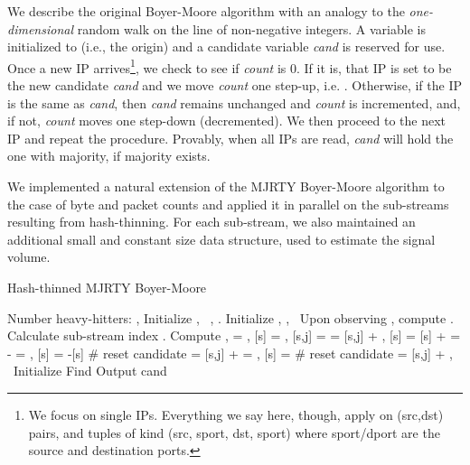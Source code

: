 \documentclass[10pt, conference, letterpaper,onecolumn]{IEEEtranv1.8}
\theoremstyle{plain}\newtheorem{thm}{Theorem}\newtheorem{lem}{Lemma}
\theoremstyle{definition}
\begin{document}
 We describe the original  Boyer-Moore algorithm with an analogy to the \emph{one-dimensional}
 random walk on the line of non-negative integers.  A variable  is initialized to  (i.e., the origin)
 and a  candidate variable \emph{cand} is reserved for use. Once a new IP arrives\footnote{We focus on single IPs. Everything we say here, though, apply on (src,dst) pairs,
and tuples of kind (src, sport, dst, sport) where sport/dport are the source and destination ports.},  
 we check to see if \emph{count} is 0. If it is, that IP is set to be the new candidate \emph{cand}
and  we move \emph{count} one step-up, i.e. . Otherwise, if the IP is the same as \emph{cand}, then 
\emph{cand} remains unchanged and \emph{count} is incremented, and, if not, \emph{count} moves one step-down 
(decremented). We then proceed to the next IP and repeat the procedure. Provably, when all IPs are read,
\emph{cand} will hold  the one with majority, if majority exists.  

 
We implemented a natural extension of the MJRTY Boyer-Moore algorithm to the case of byte and packet 
counts and applied it in parallel on the sub-streams resulting from hash-thinning. For each sub-stream, we also 
maintained an additional small and constant size data structure, used to estimate the signal volume.
 










\setcounter{algorithm}{2} 
\begin{algorithm}[t]
\caption{Hash-thinned MJRTY Boyer-Moore}
\label{alg:bm}
\begin{algorithmic}[1]
\REQUIRE Number heavy-hitters: , 
\STATE [Start]  Initialize  , \ , . 
\STATE Initialize  ,  , \ 
\STATE Upon observing , compute .
\STATE [Thin] Calculate sub-stream index .
\STATE [Hash] Compute , 
\STATE [Update]
\IF{}
   \STATE [s] = , [s] = , [s,j] = 
\ELSE
    \IF{}
         \STATE [s,j] =  [s,j]  + , [s] =  [s] + 
     \ELSE
          \IF{}
               \STATE  =  - 
               \IF{}
                    \STATE [s] = , [s] = -[s]   {\# reset candidate}
               \ENDIF
               \STATE [s,j] =  [s,j]  + 
          \ELSE 
             \STATE  [s] = ,  [s] =  {\# reset candidate}
             \STATE  [s,j] = [s,j]  +  
          \ENDIF   
    \ENDIF
\ENDIF
{}
     \STATE , \ 
       \STATE Initialize 
        \STATE Find  
         \STATE Output cand 
  \ENDFOR
\ENDIF
\end{algorithmic}
\end{algorithm} 
 
\end{document}
